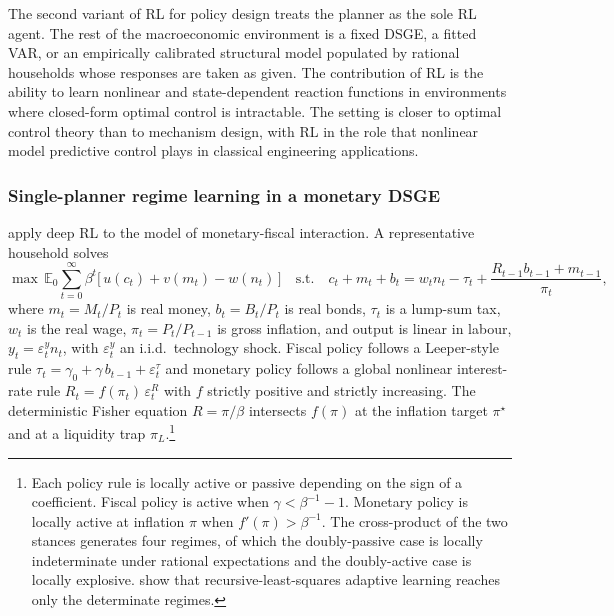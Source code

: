 The second variant of RL for policy design treats the planner as the
sole RL agent. The rest of the macroeconomic environment is a fixed
DSGE, a fitted VAR, or an empirically calibrated structural model
populated by rational households whose responses are taken as given.
The contribution of RL is the ability to learn nonlinear and
state-dependent reaction functions in environments where closed-form
optimal control is intractable. The setting is closer to optimal
control theory than to mechanism design, with RL in the role that
nonlinear model predictive control plays in classical engineering
applications.

\subsubsection{Single-planner regime learning in a monetary DSGE}
\label{sec:macro:cjk}

\citet{Chen2021drl} apply deep RL to the \citet{Benhabib2001} model
of monetary-fiscal interaction. A representative household solves
\begin{equation}
\max\, \mathbb{E}_0 \sum_{t=0}^{\infty} \beta^t \bigl[\,u(c_t) + v(m_t) - w(n_t)\,\bigr]
\quad \text{s.t.} \quad c_t + m_t + b_t = w_t n_t - \tau_t + \frac{R_{t-1} b_{t-1} + m_{t-1}}{\pi_t},
\label{eq:macro:cjk-household}
\end{equation}
where $m_t = M_t/P_t$ is real money, $b_t = B_t/P_t$ is real bonds,
$\tau_t$ is a lump-sum tax, $w_t$ is the real wage, $\pi_t =
P_t/P_{t-1}$ is gross inflation, and output is linear in labour,
$y_t = \varepsilon^y_t n_t$, with $\varepsilon^y_t$ an i.i.d.\
technology shock. Fiscal policy follows a Leeper-style rule
$\tau_t = \gamma_0 + \gamma\, b_{t-1} + \varepsilon^\tau_t$ and
monetary policy follows a global nonlinear interest-rate rule
$R_t = f(\pi_t)\, \varepsilon^R_t$ with $f$ strictly positive and
strictly increasing. The deterministic Fisher equation
$R = \pi/\beta$ intersects $f(\pi)$ at the inflation target
$\pi^\star$ and at a liquidity trap $\pi_L$.\footnote{Each policy
rule is locally active or passive depending on the sign of a
coefficient. Fiscal policy is active when $\gamma < \beta^{-1} - 1$.
Monetary policy is locally active at inflation $\pi$ when
$f'(\pi) > \beta^{-1}$. The cross-product of the two stances
generates four regimes, of which the doubly-passive case is locally
indeterminate under rational expectations and the doubly-active case
is locally explosive. \citet{EvansHonkapohja2005} show that
recursive-least-squares adaptive learning reaches only the
determinate regimes.}

